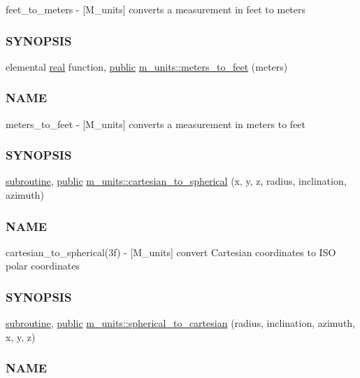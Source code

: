 \begin{DoxyCompactItemize}
\begin{DoxyCompactList}
feet\+\_\+to\+\_\+meters -\/ \mbox{[}M\+\_\+units\mbox{]} converts a measurement in feet to meters \subsubsection*{S\+Y\+N\+O\+P\+S\+IS}\end{DoxyCompactList}\item 
elemental \hyperlink{read__watch_83_8txt_abdb62bde002f38ef75f810d3a905a823}{real} function, \hyperlink{M__stopwatch_83_8txt_a2f74811300c361e53b430611a7d1769f}{public} \hyperlink{namespacem__units_a0ac5ab49814761420953eb6b859c80fd}{m\+\_\+units\+::meters\+\_\+to\+\_\+feet} (meters)
\begin{DoxyCompactList}\small\item\em \subsubsection*{N\+A\+ME}

meters\+\_\+to\+\_\+feet -\/ \mbox{[}M\+\_\+units\mbox{]} converts a measurement in meters to feet \subsubsection*{S\+Y\+N\+O\+P\+S\+IS}\end{DoxyCompactList}\item 
\hyperlink{M__stopwatch_83_8txt_acfbcff50169d691ff02d4a123ed70482}{subroutine}, \hyperlink{M__stopwatch_83_8txt_a2f74811300c361e53b430611a7d1769f}{public} \hyperlink{namespacem__units_a3a1fe55d63ec4ac38f3d00005f9ebac5}{m\+\_\+units\+::cartesian\+\_\+to\+\_\+spherical} (x, y, z, radius, inclination, azimuth)
\begin{DoxyCompactList}\small\item\em \subsubsection*{N\+A\+ME}

cartesian\+\_\+to\+\_\+spherical(3f) -\/ \mbox{[}M\+\_\+units\mbox{]} convert Cartesian coordinates to I\+SO polar coordinates \subsubsection*{S\+Y\+N\+O\+P\+S\+IS}\end{DoxyCompactList}\item 
\hyperlink{M__stopwatch_83_8txt_acfbcff50169d691ff02d4a123ed70482}{subroutine}, \hyperlink{M__stopwatch_83_8txt_a2f74811300c361e53b430611a7d1769f}{public} \hyperlink{namespacem__units_ae79705192f0982ec3a091c4df260dfcd}{m\+\_\+units\+::spherical\+\_\+to\+\_\+cartesian} (radius, inclination, azimuth, x, y, z)
\begin{DoxyCompactList}\small\item\em \subsubsection*{N\+A\+ME}


\end{DoxyCompactList}
\end{DoxyCompactItemize}
